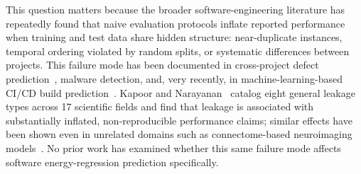\documentclass[preprint,12pt]{elsarticle}
\begin{document}
This question matters because the broader software-engineering literature has repeatedly found that naive evaluation protocols inflate reported performance when training and test data share hidden structure: near-duplicate instances, temporal ordering violated by random splits, or systematic differences between projects. This failure mode has been documented in cross-project defect prediction~\citep{cpdp2026domainadaptation}, malware detection, and, very recently, in machine-learning-based CI/CD build prediction~\citep{buildpred2026taxonomy}. Kapoor and Narayanan~\cite{kapoor2023leakage} catalog eight general leakage types across 17 scientific fields and find that leakage is associated with substantially inflated, non-reproducible performance claims; similar effects have been shown even in unrelated domains such as connectome-based neuroimaging models~\citep{rosenblatt2024leakage}. No prior work has examined whether this same failure mode affects software energy-regression prediction specifically.
\end{document}
